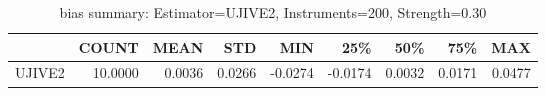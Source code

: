 \begin{table}[ht]
\centering
\caption{bias summary: Estimator=UJIVE2, Instruments=200, Strength=0.30}
\begin{tabular}{lrrrrrrrr}
\toprule
 & COUNT & MEAN & STD & MIN & 25\% & 50\% & 75\% & MAX \\
\midrule
UJIVE2 & 10.0000 & 0.0036 & 0.0266 & -0.0274 & -0.0174 & 0.0032 & 0.0171 & 0.0477 \\
\bottomrule
\end{tabular}
\end{table}
